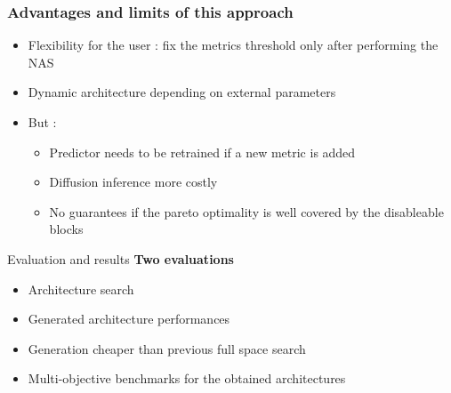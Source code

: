 \documentclass[aspectratio=169,xcolor=dvipsnames]{beamer}
\begin{document}

\begin{frame}
    \frametitle{Advantages and limits of this approach}
    \begin{itemize}
        \item Flexibility for the user : fix the metrics threshold only after performing the NAS
        \item Dynamic architecture depending on external parameters
        \item But :
              \begin{itemize}
                  \item Predictor needs to be retrained if a new metric is added
                  \item Diffusion inference more costly
                  \item No guarantees if the pareto optimality is well covered by the disableable blocks
              \end{itemize}
    \end{itemize}
\end{frame}

\begin{frame}{Evaluation and results}
    \textbf{Two evaluations}
    \begin{itemize}
        \item Architecture search
        \item Generated architecture performances
    \end{itemize}

    \begin{itemize}
        \item Generation cheaper than previous full space search
        \item Multi-objective benchmarks for the obtained architectures
    \end{itemize}
\end{frame}
\end{document}
